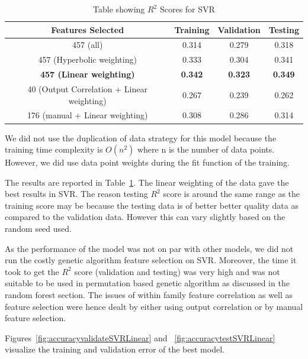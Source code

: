 \documentclass[11pt]{article}
\begin{document}
\begin{table} [h!]
\centering
 \begin{tabular}{ | c | c | c | c | }
\hline
\textbf{Features Selected} & \textbf{Training} & \textbf{Validation} &  \textbf{Testing} \\ [0.5 ex]
\hline \hline
457 (all) & 0.314 & 0.279 & 0.318\\
457 (Hyperbolic weighting) & 0.333 & 0.304 & 0.341\\
\textbf{457 (Linear weighting)} & \textbf{0.342} &\textbf{0.323} & \textbf{0.349}\\
40 (Output Correlation + Linear weighting)\footnotemark[1] & 0.267 & 0.239  & 0.262 \\ 
176 (manual + Linear weighting) & 0.308  & 0.286  & 0.314\\ [1ex]
\hline
\end{tabular}
\caption{Table showing  $R^2$ Scores for SVR}
\label {table:2}
\end{table}

We did not use the duplication of data strategy for this model because the training time complexity is $O(n^2)$ where n is the number of data points.
However,  we did use data point weights during the fit function of the training.

The results are reported in Table~\ref{table:2}.
The linear weighting of the data gave the best results in SVR.
The reason testing $R^2$ score is around the same range as the training score may be because the testing data is of better better quality data as compared to the validation data.
However this can vary slightly based on the random seed used.

As the performance of the model was not on par with other models,
we did not run the costly genetic algorithm feature selection on SVR.
Moreover,  the time it took to get the $R^2$ score (validation and testing) was very high and was not suitable to be used in permutation based genetic algorithm as discussed in the random forest section.
The issues of within family feature correlation as well as feature selection were hence dealt by either using output correlation or by manual feature selection.

Figures~\ref{fig:accuracyvalidateSVRLinear} and ~\ref{fig:accuracytestSVRLinear} visualize the training and validation error of the best model.
\end{document}
